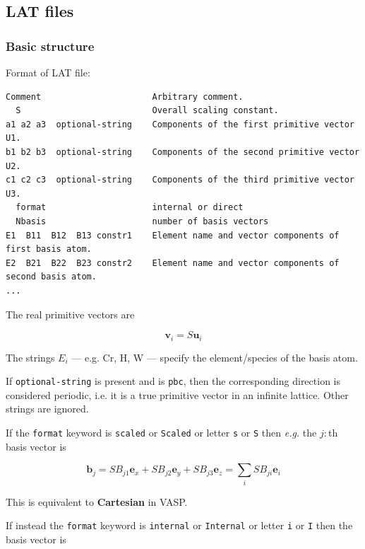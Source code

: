 \documentclass[a4paper,12pt,pdftex,onecolumn]{article}
\newcommand{\eg}{\emph{e.g.}\xspace}
\begin{document}
\subsection{LAT files}


\subsubsection{Basic structure}

Format of LAT file:

\begin{Verbatim}[fontsize=\relsize{-1},frame=single]
Comment                      Arbitrary comment.
  S                          Overall scaling constant.
a1 a2 a3  optional-string    Components of the first primitive vector U1.
b1 b2 b3  optional-string    Components of the second primitive vector U2.
c1 c2 c3  optional-string    Components of the third primitive vector U3.
  format                     internal or direct
  Nbasis                     number of basis vectors
E1  B11  B12  B13 constr1    Element name and vector components of first basis atom.
E2  B21  B22  B23 constr2    Element name and vector components of second basis atom.
...
\end{Verbatim}

The real primitive vectors are

\begin{equation}
\mathbf{v}_i = S \mathbf{u}_i
\end{equation}

The strings $E_i$ --- e.g. Cr, H, W --- specify the element/species of the basis atom.

If \verb+optional-string+ is present and is \verb+pbc+, then
the corresponding direction is
considered periodic, i.e. it is a true primitive vector
in an infinite lattice. Other strings are ignored.

If the \verb+format+ keyword is \verb+scaled+ or \verb+Scaled+ or
letter \verb+s+ or \verb+S+ then \eg the $j:$th basis vector is

\begin{equation}
\mathbf{b}_j = S B_{j1} \mathbf{e}_x
+ S B_{j2} \mathbf{e}_y
+ S B_{j3} \mathbf{e}_z
= \sum_i S B_{ji} \mathbf{e}_i
\end{equation}

This is equivalent to \textbf{Cartesian} in VASP.

If instead the \verb+format+ keyword is \verb+internal+ or \verb+Internal+
or letter \verb+i+ or \verb+I+ then the basis vector is
\end{document}
